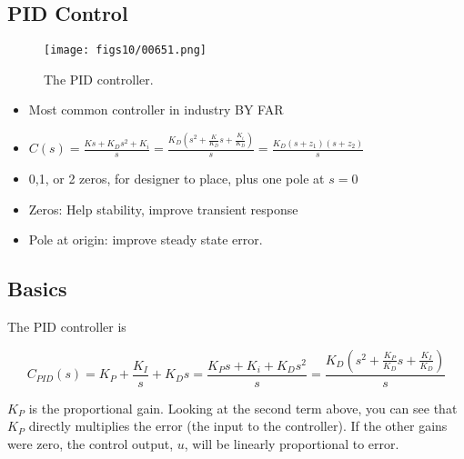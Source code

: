 \subsection{PID Control} 

\begin{figure}\centering
\texttt{[image: figs10/00651.png]}
\caption{The PID controller.}\label{PIDBlockDiagram}
\end{figure}


\begin{itemize}
	\item Most common controller in industry BY FAR
	\item
$C(s) = \frac{Ks+K_Ds^2 + K_i}{s} = \frac{K_D(s^2 + \frac{K}{K_D}s+ \frac{K_i}{K_D})}{s} =
\frac{K_D(s+z_1)(s+z_2)}{s}$
	\item 0,1, or 2 zeros,  for designer to place, plus one pole at $s=0$
	\item Zeros:   Help stability, improve transient response
	\item Pole at origin:  improve steady state error.
\end{itemize}
 



\subsection{Basics}


The PID controller is

\begin{equation}\label{PID}
C_{PID}(s) = K_P + \frac{K_I}{s} + K_Ds = \frac{K_Ps+K_i + K_Ds^2}{s} = \frac{K_D(s^2 + \frac{K_P}{K_D}s + \frac{K_I}{K_D})}{s}
\end{equation}




{\bf $K_P$}  is the proportional gain.
Looking at the second term above, you can see that $K_P$ directly multiplies the error (the input to the controller).  If the other gains were zero, the control output, $u$, will be  linearly proportional to error.	%

